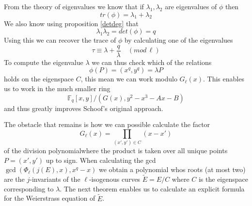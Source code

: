 From the theory of eigenvalues we know that if $\lambda_1, \lambda_2$ are
eigenvalues of $\phi$ then $$tr(\phi) = \lambda_1 + \lambda_2$$
We also know using proposition \ref{detdeg} that $$\lambda_1 \lambda_2 = det(\phi) = q $$
Using this we can recover the trace of $\phi$ by calculating one of the eigenvalues
$$ \tau \equiv \lambda + \frac{q}{\lambda} \quad (mod\, \ell) $$
To compute the eigenvalue $\lambda$ we can thus check which of the relations
$$ \phi(P) = (x^q, y^q) = \lambda P$$
holds on the eigenspace $C$, this mean we can work modulo $G_\ell(x)$. This enables us
to work in the much smaller ring $$\mathbb{F}_q[x,y]/(G(x), y^2 - x^3 - Ax - B) $$
and thus greatly improves Schoof's original approach.

The obstacle that remains is how we can possible calculate the factor 
$$ G_\ell(x) = \prod_{(x',y')\in C} (x-x')$$
of the division polynomialwhere the product is taken over all 
unique points $P = (x', y')$ up to sign. When calculating the gcd
$\gcd(\Phi_\ell(j(E), x), x^q - x)$ we obtain a polynomial whos roots
(at most two) are the $j$-invariants of the $\ell$-isogenous curves
$\tilde{E} = E/C$ where $C$ is the eigenspace corresponding to $\lambda$.
The next theorem enables us to calculate an explicit formula for the Weierstrass
equation of $\tilde{E}$.

